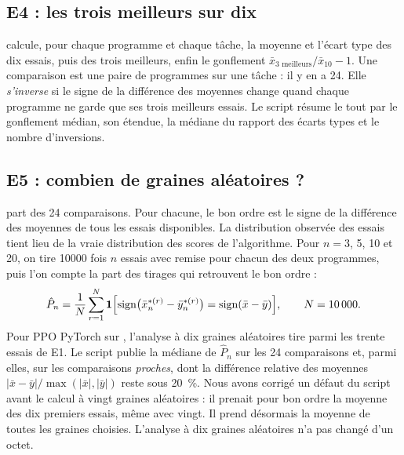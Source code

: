 \subsection{E4 : les trois meilleurs sur dix}\label{sec:plan-e4}
 calcule, pour chaque programme et chaque tâche, la moyenne et l'écart type des dix
essais, puis des trois meilleurs, enfin le gonflement $\bar x_{\text{3 meilleurs}}/\bar x_{10}-1$. Une comparaison
est une paire de programmes sur une tâche : il y en a 24. Elle \emph{s'inverse} si le signe de la différence
des moyennes change quand chaque programme ne garde que ses trois meilleurs essais. Le script résume le tout
par le gonflement médian, son étendue, la médiane du rapport des écarts types et le nombre d'inversions.

\subsection{E5 : combien de graines aléatoires ?}\label{sec:plan-e5}
 part des 24 comparaisons. Pour chacune, le bon ordre est le signe de la différence
des moyennes de tous les essais disponibles. La distribution observée des essais tient lieu de la vraie distribution des scores de l'algorithme. Pour
$n=3$, 5, 10 et 20, on tire \num{10000} fois $n$ essais avec remise pour chacun des deux programmes, puis l'on
compte la part des tirages qui retrouvent le bon ordre :
\begin{equation}\label{eq:e5}
  \hat P_n=\frac{1}{N}\sum_{r=1}^{N}\mathbf{1}\Bigl[\operatorname{sign}\bigl(\bar x^{*(r)}_n-\bar y^{*(r)}_n\bigr)
  =\operatorname{sign}(\bar x-\bar y)\Bigr],\qquad N=\num{10000}.
\end{equation}
Pour PPO PyTorch sur , l'analyse à dix graines aléatoires tire parmi les trente essais de E1. Le script
publie la médiane de $\hat P_n$ sur les 24 comparaisons et, parmi elles, sur les comparaisons \emph{proches},
dont la différence relative des moyennes $|\bar x-\bar y|/\max(|\bar x|,|\bar y|)$ reste sous 20~\%. Nous avons corrigé
un défaut du script avant le calcul à vingt graines aléatoires : il prenait pour bon ordre la moyenne des dix premiers essais,
même avec vingt. Il prend désormais la moyenne de toutes les graines choisies. L'analyse à dix graines aléatoires n'a pas
changé d'un octet.


